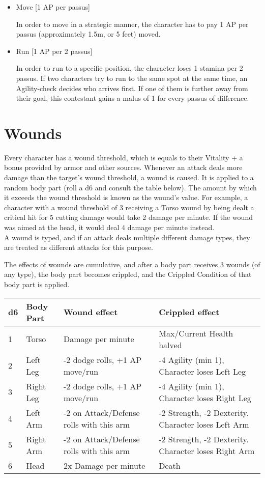 \begin{itemize}
\item Move [1 AP per passus]

In order to move in a strategic manner, the character has to pay 1 AP per passus (approximately 1.5m, or 5 feet) moved. 



\item Run  [1 AP per 2 passus]

In order to run to a specific position, the character loses 1 stamina per 2 passus. If two characters try to run to the same spot at the same time, an Agility-check decides who arrives first. If one of them is further away from their goal, this contestant gains a malus of 1 for every passus of difference.
\end{itemize}

\section{Wounds}
Every character has a wound threshold, which is equals to their Vitality + a bonus provided by armor and other sources. Whenever an attack deals more damage than the target's wound threshold, a wound is caused. It is applied to a random body part (roll a d6 and consult the table below). The amount by which it exceeds the wound threshold is known as the wound's value. For example, a character with a wound threshold of 3 receiving a Torso wound by being dealt a critical hit for 5 cutting damage would take 2 damage per minute. If the wound was aimed at the head, it would deal 4 damage per minute instead.\\
A wound is typed, and if an attack deals multiple different damage types, they are treated as different attacks for this purpose.

The effects of wounds are cumulative, and after a body part receives 3 wounds (of any type), the body part becomes crippled, and the Crippled Condition of that body part is applied.\\

\begin{tabular}{l p{1cm} p{5cm} p{3cm}}
d6 & Body Part & Wound effect & Crippled effect\\ \hline
1 & Torso & Damage per minute & Max/Current Health halved\\
2 & Left Leg & -2 dodge rolls, +1 AP move/run & -4 Agility (min 1), Character loses Left Leg\\
3 & Right Leg & -2 dodge rolls, +1 AP move/run & -4 Agility (min 1), Character loses Right Leg\\
4 & Left Arm & -2 on Attack/Defense rolls with this arm & -2 Strength, -2 Dexterity. Character loses Left Arm\\
5 & Right Arm & -2 on Attack/Defense rolls with this arm & -2 Strength, -2 Dexterity. Character loses Right Arm\\
6 & Head & 2x Damage per minute & Death
\end{tabular}
